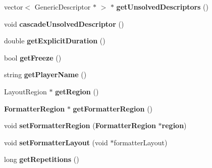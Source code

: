 \begin{CompactItemize}
\item 
vector$<$ GenericDescriptor $\ast$ $>$ $\ast$ \textbf{getUnsolvedDescriptors} ()\label{classbr_1_1pucrio_1_1telemidia_1_1ginga_1_1ncl_1_1model_1_1presentation_1_1CascadingDescriptor_ea6542ead0583dcb66a14149b60d52f2}

\item 
void \textbf{cascadeUnsolvedDescriptor} ()\label{classbr_1_1pucrio_1_1telemidia_1_1ginga_1_1ncl_1_1model_1_1presentation_1_1CascadingDescriptor_076e2b60fa54493d996d89d5120c3dfc}

\item 
double \textbf{getExplicitDuration} ()\label{classbr_1_1pucrio_1_1telemidia_1_1ginga_1_1ncl_1_1model_1_1presentation_1_1CascadingDescriptor_0d7f6766c28fafc1f300f81ffe58a3da}

\item 
bool \textbf{getFreeze} ()\label{classbr_1_1pucrio_1_1telemidia_1_1ginga_1_1ncl_1_1model_1_1presentation_1_1CascadingDescriptor_b7d0d56200264dcddffdbbb9d36a9f1f}

\item 
string \textbf{getPlayerName} ()\label{classbr_1_1pucrio_1_1telemidia_1_1ginga_1_1ncl_1_1model_1_1presentation_1_1CascadingDescriptor_6a599a62d8caad7d0bb3d96e316e30e4}

\item 
LayoutRegion $\ast$ \textbf{getRegion} ()\label{classbr_1_1pucrio_1_1telemidia_1_1ginga_1_1ncl_1_1model_1_1presentation_1_1CascadingDescriptor_2319d18f869fff6c962400934accaac4}

\item 
{\bf FormatterRegion} $\ast$ \textbf{getFormatterRegion} ()\label{classbr_1_1pucrio_1_1telemidia_1_1ginga_1_1ncl_1_1model_1_1presentation_1_1CascadingDescriptor_dd91ec7e9f1a343d8af0d814df5ad19e}

\item 
void \textbf{setFormatterRegion} ({\bf FormatterRegion} $\ast${\bf region})\label{classbr_1_1pucrio_1_1telemidia_1_1ginga_1_1ncl_1_1model_1_1presentation_1_1CascadingDescriptor_b710955a3f17412ddefeead636283131}

\item 
void \textbf{setFormatterLayout} (void $\ast$formatterLayout)\label{classbr_1_1pucrio_1_1telemidia_1_1ginga_1_1ncl_1_1model_1_1presentation_1_1CascadingDescriptor_228710ed4d8a8bd1df6c3a54fea1e920}

\item 
long \textbf{getRepetitions} ()\label{classbr_1_1pucrio_1_1telemidia_1_1ginga_1_1ncl_1_1model_1_1presentation_1_1CascadingDescriptor_df811128997837cc0d2e9a9b18c14d90}


\end{CompactItemize}
